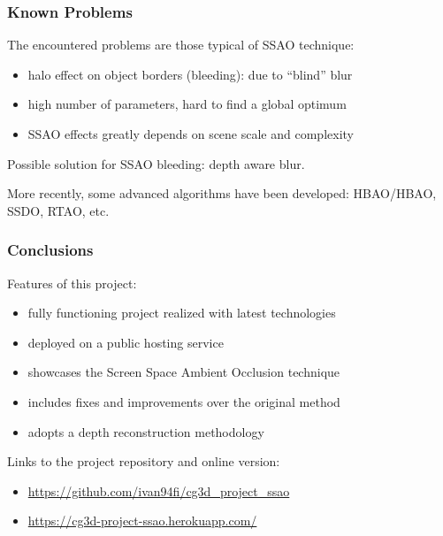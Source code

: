 \documentclass{beamer}
\newcommand{\textplus}{\raisebox{.1\height}{\scalebox{.9}{\texttt{+}}}}
\begin{document}
\begin{frame}
\frametitle{Known Problems}
The encountered problems are those typical of SSAO technique:
\begin{itemize}
    \item halo effect on object borders (bleeding): due to ``blind'' blur
    \item high number of parameters, hard to find a global optimum
    \item SSAO effects greatly depends on scene scale and complexity
\end{itemize}

Possible solution for SSAO bleeding: depth aware blur.

More recently, some advanced algorithms have been developed: HBAO/HBAO\textplus, SSDO, RTAO, etc.
\end{frame}



\begin{frame}
\frametitle{Conclusions}
Features of this project:
\begin{itemize}
    \item fully functioning project realized with latest technologies
    \item deployed on a public hosting service
    \item showcases the Screen Space Ambient Occlusion technique
    \item includes fixes and improvements over the original method
    \item adopts a depth reconstruction methodology
\end{itemize}

Links to the project repository and online version:
\begin{itemize}
    \item \url{https://github.com/ivan94fi/cg3d_project_ssao}
    \item \url{https://cg3d-project-ssao.herokuapp.com/}
\end{itemize}

\end{frame}

\end{document}
